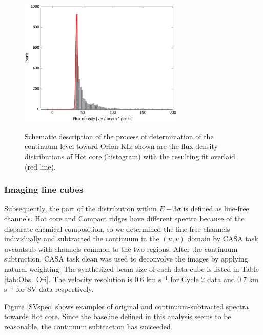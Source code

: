\begin{figure}[hbp] 
\centering
\vspace{-0.5cm}
\includegraphics[width=0.7\textwidth]{OrionKL/ex_histogram_fit.eps}
\label{fig:histo}
\vspace{-1.5cm}
\caption{Schematic description of the process of determination of the continuum level toward Orion-KL: 
shown are the flux density distributions of Hot core (histogram) with the resulting fit overlaid (red line).}
\end{figure}

\newpage

\subsubsection*{Imaging line cubes}
Subsequently, the part of the distribution within $E - 3\sigma$ is defined as line-free channels.
Hot core and Compact ridges have different spectra because of the disparate chemical composition, 
so we determined the line-free channels individually and subtracted the continuum
in the $(u,v)$ domain by CASA task {\sc uvcontsub} with channels common to the two regions.
After the continuum subtraction, CASA task {\sc clean} was used to deconvolve the images by applying natural weighting.
The synthesized beam size of each data cube is listed in Table \ref{tab:Obs_Ori}. 
The velocity resolution is 0.6 km s$^{-1}$ for Cycle 2 data and 0.7 km s$^{-1}$ for SV data respectively.

Figure \ref{SVspec} shows examples of original and continuum-subtracted spectra towards Hot core. 
Since the baseline defined in this analysis seems to be reasonable, the continuum subtraction has succeeded.

